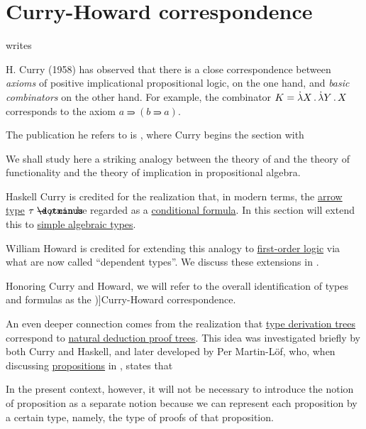 \section{Curry-Howard correspondence}\label{sec:curry_howard_correspondence}

\begin{concept}\label{con:curry_howard_correspondence}
   writes
  \begin{displayquote}
    H. Curry (1958) has observed that there is a close correspondence between \textit{axioms} of positive implicational propositional logic, on the one hand, and \textit{basic combinators} on the other hand. For example, the combinator \( K = \qabs X \qabs Y X \) corresponds to the axiom \( a \rightimply (b \rightimply a) \).
  \end{displayquote}

  The publication he refers to is \cite[312]{CurryFeysCraig1958CombinatoryLogicVol1}, where Curry begins the section with
  \begin{displayquote}
    We shall study here a striking analogy between the theory of and the theory of functionality and the theory of implication in propositional algebra.
  \end{displayquote}

  Haskell Curry is credited for the realization that, in modern terms, the \hyperref[def:arrow_type]{arrow type} \( \tau \synimplies \rho \) can be regarded as a \hyperref[def:propositional_alphabet/connectives/conditional]{conditional formula}. In this section will extend this to \hyperref[def:simple_algebraic_types]{simple algebraic types}.

  William Howard is credited for extending this analogy to \hyperref[sec:first_order_logic]{first-order logic} via what are now called \enquote{dependent types}. We discuss these extensions in .

  Honoring Curry and Howard, we will refer to the overall identification of types and formulas as the \term[en=Curry-Howard correspondence (\cite[def. 4.1.7]{Mimram2020ProgramEqualsProof})]{Curry-Howard correspondence}.

  An even deeper connection comes from the realization that \hyperref[def:type_derivation_tree]{type derivation trees} correspond to \hyperref[def:propositional_natural_deduction_proof_tree]{natural deduction proof trees}. This idea was investigated briefly by both Curry and Haskell, and later developed by Per Martin-L\"of, who, when discussing \hyperref[con:proposition]{propositions} in \cite[76]{MartinLöf1975IntuitionisticTypeTheory}, states that
  \begin{displayquote}
    In the present context, however, it will not be necessary to introduce the notion of proposition as a separate notion because we can represent each proposition by a certain type, namely, the type of proofs of that proposition.
  \end{displayquote}
\end{concept}
